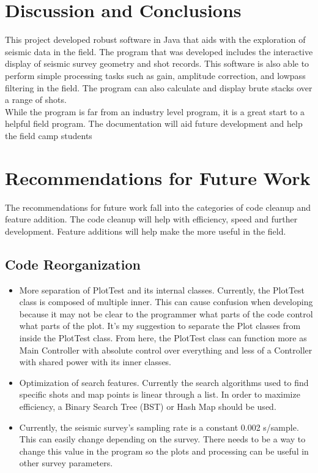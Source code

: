 \documentclass[12pt]{article}
\begin{document}
\section{Discussion and Conclusions}

This project developed robust software in Java that aids with the exploration of seismic data in the field. The program that was developed includes the interactive display of seismic survey geometry and shot records. This software is also able to perform simple processing tasks such as gain, amplitude correction, and lowpass filtering in the field. The program can also calculate and display brute stacks over a range of shots.  \\ 

While the program is far from an industry level program, it is a great start to a helpful field program. The documentation will aid future development and help the field camp students 

\section{Recommendations for Future Work}

The recommendations for future work fall into the categories of code cleanup and feature addition. The code cleanup will help with efficiency, speed and further development. Feature additions will help make the more useful in the field. 

\subsection{Code Reorganization}

\begin{itemize}
\item More separation of PlotTest and its internal classes. Currently, the PlotTest class is composed of multiple inner. This can cause confusion when developing because it may not be clear to the programmer what parts of the code control what parts of the plot. It's my suggestion to separate the Plot classes from inside the PlotTest class. From here, the PlotTest class can function more as Main Controller with absolute control over everything and less of a Controller with shared power with its inner classes.

\item Optimization of search features. Currently the search algorithms used to find specific shots and map points is linear through a list. In order to maximize efficiency, a Binary Search Tree (BST) or Hash Map should be used.

\item Currently, the seismic survey's sampling rate is a constant 0.002 s/sample. This can easily change depending on the survey. There needs to be a way to change this value in the program so the plots and processing can be useful in other survey parameters.
\end{itemize}
\end{document}
